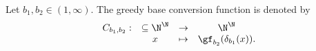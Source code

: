     
    \begin{doubtfulsec}
    \begin{definition}
        Let $b_1,b_2 \in (1,\infty)$. The greedy base conversion function is denoted by 
        \begin{equation}
            \begin{array}{cclc}
                C_{b_1,b_2} : & \subseteq \N^\N & \to & \N^\N\\
                & x & \mapsto &  \gf_{b_2}(\delta_{b_1}(x)).
            \end{array}
        \end{equation}
    \end{definition}
    \end{doubtfulsec}

